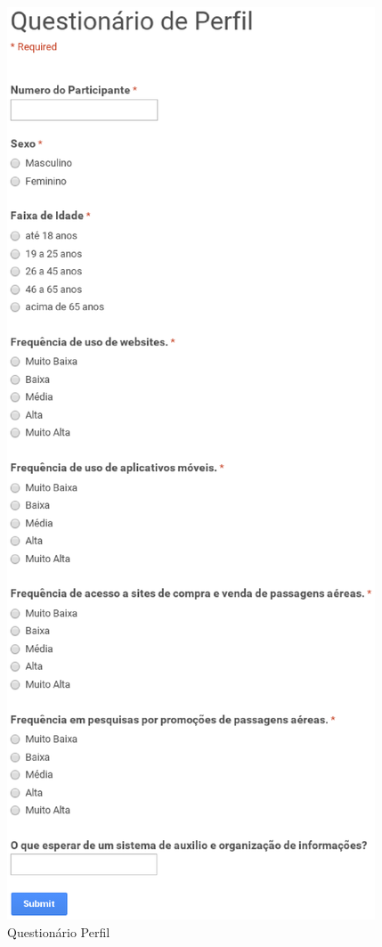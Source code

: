 \begin{apendicesenv}
\begin{figure}[h]
	\includegraphics[scale=0.5]{figuras/questionario_perfil.eps}
	\caption{Questionário Perfil}
\end{figure}
\begin{figure}[h]
	\centering

\end{figure}
\end{apendicesenv}

